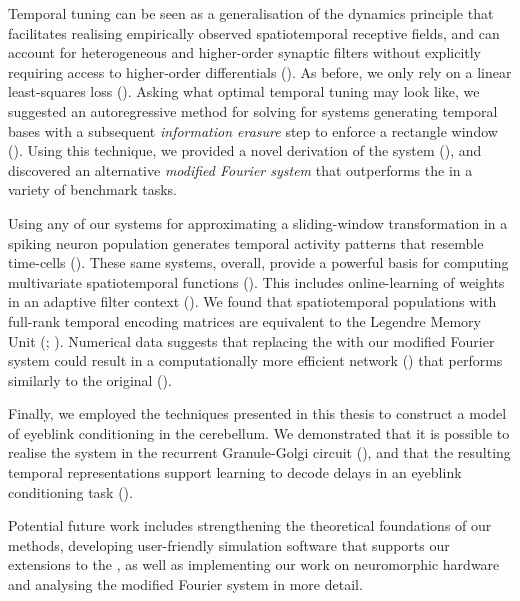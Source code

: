 Temporal tuning can be seen as a generalisation of the \NEF dynamics principle that facilitates realising empirically observed spatiotemporal receptive fields, and can account for heterogeneous and higher-order synaptic filters without explicitly requiring access to higher-order differentials ().
As before, we only rely on a linear least-squares loss ().
Asking what optimal temporal tuning may look like, we suggested an autoregressive method for solving for \LTI systems generating temporal bases with a subsequent \emph{information erasure} step to enforce a rectangle window ().
Using this technique, we provided a novel derivation of the \LDN system (), and discovered an alternative \emph{modified Fourier system} that outperforms the \LDN in a variety of benchmark tasks.

Using any of our \LTI systems for approximating a sliding-window transformation in a spiking neuron population generates temporal activity patterns that resemble time-cells ().
These same systems, overall, provide a powerful basis for computing multivariate spatiotemporal functions ().
This includes online-learning of weights in an adaptive filter context ().
We found that spatiotemporal \NEF populations with full-rank temporal encoding matrices are equivalent to the Legendre Memory Unit (\LMU; \cite{voelker2019lmu}).
Numerical data suggests that replacing the \LDN with our modified Fourier system could result in a computationally more efficient network () that performs similarly to the original \LMU ().

Finally, we employed the techniques presented in this thesis to construct a model of eyeblink conditioning in the cerebellum.
We demonstrated that it is possible to realise the \LDN system in the recurrent Granule-Golgi circuit (), and that the resulting temporal representations support learning to decode delays in an eyeblink conditioning task ().

Potential future work includes strengthening the theoretical foundations of our methods, developing user-friendly simulation software that supports our extensions to the \NEF, as well as implementing our work on neuromorphic hardware and analysing the modified Fourier system in more detail.

